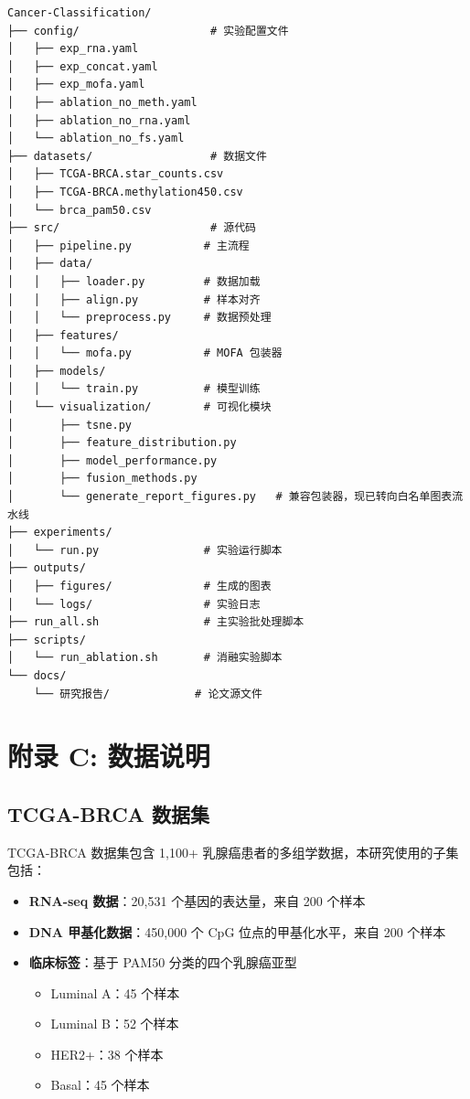 \begin{verbatim}
Cancer-Classification/
├── config/                    # 实验配置文件
│   ├── exp_rna.yaml
│   ├── exp_concat.yaml
│   ├── exp_mofa.yaml
│   ├── ablation_no_meth.yaml
│   ├── ablation_no_rna.yaml
│   └── ablation_no_fs.yaml
├── datasets/                  # 数据文件
│   ├── TCGA-BRCA.star_counts.csv
│   ├── TCGA-BRCA.methylation450.csv
│   └── brca_pam50.csv
├── src/                       # 源代码
│   ├── pipeline.py           # 主流程
│   ├── data/
│   │   ├── loader.py         # 数据加载
│   │   ├── align.py          # 样本对齐
│   │   └── preprocess.py     # 数据预处理
│   ├── features/
│   │   └── mofa.py           # MOFA 包装器
│   ├── models/
│   │   └── train.py          # 模型训练
│   └── visualization/        # 可视化模块
│       ├── tsne.py
│       ├── feature_distribution.py
│       ├── model_performance.py
│       ├── fusion_methods.py
│       └── generate_report_figures.py   # 兼容包装器，现已转向白名单图表流水线
├── experiments/
│   └── run.py                # 实验运行脚本
├── outputs/
│   ├── figures/              # 生成的图表
│   └── logs/                 # 实验日志
├── run_all.sh                # 主实验批处理脚本
├── scripts/
│   └── run_ablation.sh       # 消融实验脚本
└── docs/
    └── 研究报告/             # 论文源文件
\end{verbatim}

\section*{附录 C: 数据说明}

\subsection*{TCGA-BRCA 数据集}

TCGA-BRCA 数据集包含 1,100+ 乳腺癌患者的多组学数据，本研究使用的子集包括：

\begin{itemize}
    \item \textbf{RNA-seq 数据}：20,531 个基因的表达量，来自 200 个样本
    \item \textbf{DNA 甲基化数据}：450,000 个 CpG 位点的甲基化水平，来自 200 个样本
    \item \textbf{临床标签}：基于 PAM50 分类的四个乳腺癌亚型
    \begin{itemize}
        \item Luminal A：45 个样本
        \item Luminal B：52 个样本
        \item HER2+：38 个样本
        \item Basal：45 个样本
    \end{itemize}
\end{itemize}

